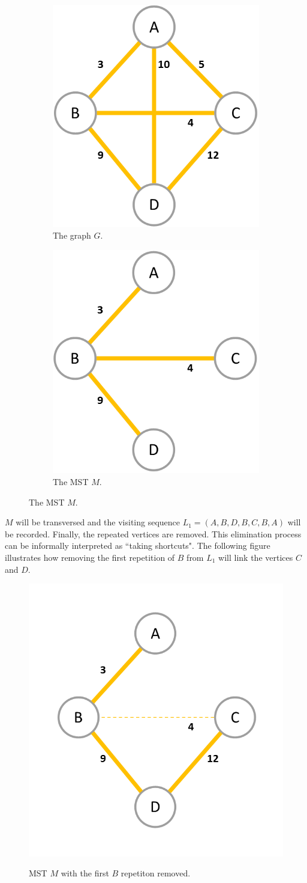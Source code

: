 \documentclass[journal]{IEEEtran}
\begin{document}
\begin{figure}[H]
	\begin{subfigure}{.5\linewidth}
		\centering
		\includegraphics[width=.5\linewidth]{ex-ta-1}
		\caption{The graph $G$.}
		\label{fig:ex-ta-1}
	\end{subfigure}%
	\begin{subfigure}{.5\linewidth}
		\centering
		\includegraphics[width=.5\linewidth]{ex-ta-2}
		\caption{The MST $M$.}
		\label{fig:em}
	\end{subfigure}
\end{figure}

$M$ will be transversed and the visiting sequence $L_1 = (A, B, D, B, C, B, A)$ will be recorded. Finally, the repeated vertices are removed. This elimination process can be informally interpreted as ``taking shortcuts". The following figure illustrates how removing the first repetition of $B$ from $L_1$ will link the vertices $C$ and $D$.
\begin{figure}[H]
	\centering
	\includegraphics[width=.4\linewidth]{ex-ta-4}
	\label{fig:exta4}
	\caption{MST $M$ with the first $B$ repetiton removed.}
\end{figure}
\end{document}
